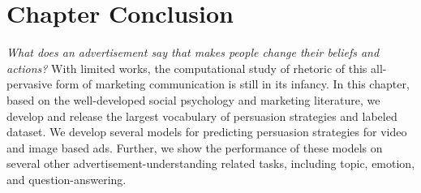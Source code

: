 \section{Chapter Conclusion}
\textit{What does an advertisement say that makes people change their beliefs and actions?} With limited works, the computational study of rhetoric of this all-pervasive form of marketing communication is still in its infancy. In this chapter, based on the well-developed social psychology and marketing literature, we develop and release the largest vocabulary of persuasion strategies and labeled dataset. We develop several models for predicting persuasion strategies for video and image based ads. Further, we show the performance of these models on several other advertisement-understanding related tasks, including topic, emotion, and question-answering.

